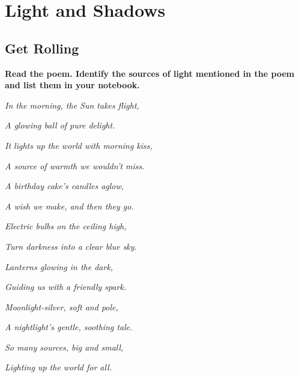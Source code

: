 \chapter{Light and Shadows}
\section{Get Rolling}
\textbf{Read the poem. Identify the sources of light mentioned in the poem and list them in your notebook.}
\vspace{0.1in}
\par
\textit{In the morning, the Sun takes flight,}\\
\vspace{0.1in}
\par
\textit{A glowing ball of pure delight.}\\
\vspace{0.1in}
\par
\textit{It lights up the world with morning kiss,}\\
\vspace{0.1in}
\par
\textit{A source of warmth we wouldn't miss.}\\
\vspace{0.1in}
\par
\textit{A birthday cake's candles aglow,}\\
\vspace{0.1in}
\par
\textit{A wish we make, and then they go.}\\
\vspace{0.1in}
\par
\textit{Electric bulbs on the ceiling high,}\\
\vspace{0.1in}
\par
\textit{Turn darkness into a clear blue sky.}\\
\vspace{0.1in}
\par
\textit{Lanterns glowing in the dark,}\\
\vspace{0.1in}
\par
\textit{Guiding us with a friendly spark.}\\
\vspace{0.1in}
\par
\textit{Moonlight-silver, soft and pole,}\\
\vspace{0.1in}
\par
\textit{A nightlight's gentle, soothing tale.}\\
\vspace{0.1in}
\par
\textit{So many sources, big and small,}\\
\vspace{0.1in}
\par
\textit{Lighting up the world for all.}
